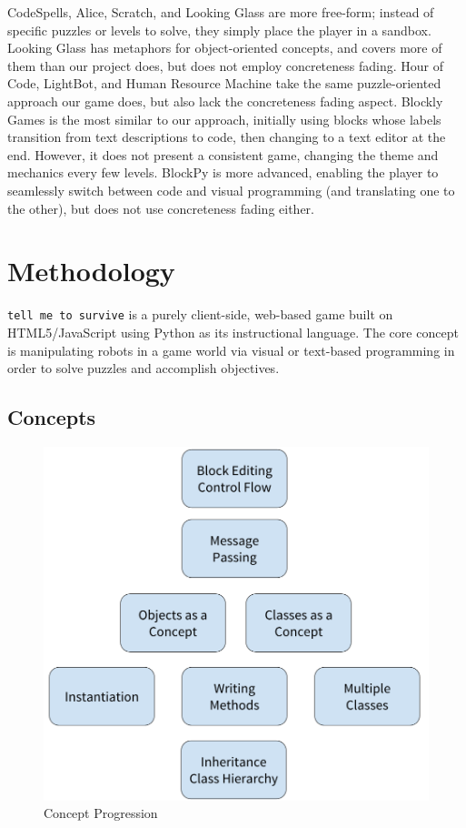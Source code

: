 \documentclass[12pt,notitlepage]{article}
\newcommand\tmts[0]{\texttt{tell me to survive}}
\begin{document}
CodeSpells, Alice, Scratch, and Looking Glass are more free-form;
instead of specific puzzles or levels to solve, they simply place the
player in a sandbox. Looking Glass has metaphors for object-oriented
concepts, and covers more of them than our project does, but does not
employ concreteness fading. Hour of Code, LightBot, and Human Resource
Machine take the same puzzle-oriented approach our game does, but also
lack the concreteness fading aspect. Blockly Games is the most similar
to our approach, initially using blocks whose labels transition from
text descriptions to code, then changing to a text editor at the
end. However, it does not present a consistent game, changing the
theme and mechanics every few levels. BlockPy is more advanced,
enabling the player to seamlessly switch between code and visual
programming (and translating one to the other), but does not use
concreteness fading either.

\section{Methodology}

\tmts{} is a purely client-side, web-based game built on
HTML5/JavaScript using Python as its instructional language. The core
concept is manipulating robots in a game world via visual or
text-based programming in order to solve puzzles and accomplish
objectives.

\subsection{Concepts}

\begin{figure}[h]
  \centering
  \includegraphics[width=.6\textwidth]{progression}
  \caption{Concept Progression}
\label{fig:progression}
\end{figure}
\end{document}
